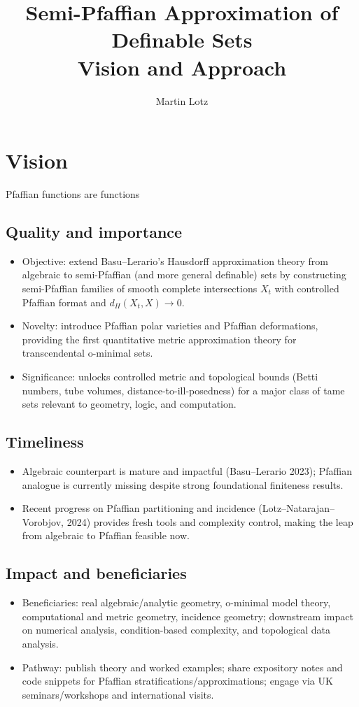 \documentclass[11pt,a4paper]{article}
\title{Semi-Pfaffian Approximation of Definable Sets\\Vision and Approach}
\author{Martin Lotz}
\date{}
\begin{document}
\maketitle


\section{Vision}
Pfaffian functions are functions 
\subsection*{Quality and importance}
\begin{itemize}
  \item Objective: extend Basu--Lerario's Hausdorff approximation theory from algebraic to semi-Pfaffian (and more general definable) sets by constructing semi-Pfaffian families of smooth complete intersections \(X_t\) with controlled Pfaffian format and \(d_H(X_t,X)\to0\).
  \item Novelty: introduce Pfaffian polar varieties and Pfaffian deformations, providing the first quantitative metric approximation theory for transcendental o-minimal sets.
  \item Significance: unlocks controlled metric and topological bounds (Betti numbers, tube volumes, distance-to-ill-posedness) for a major class of tame sets relevant to geometry, logic, and computation.
\end{itemize}

\subsection*{Timeliness}
\begin{itemize}
  \item Algebraic counterpart is mature and impactful (Basu--Lerario 2023); Pfaffian analogue is currently missing despite strong foundational finiteness results.
  \item Recent progress on Pfaffian partitioning and incidence (Lotz--Natarajan--Vorobjov, 2024) provides fresh tools and complexity control, making the leap from algebraic to Pfaffian feasible now.
\end{itemize}

\subsection*{Impact and beneficiaries}
\begin{itemize}
  \item Beneficiaries: real algebraic/analytic geometry, o-minimal model theory, computational and metric geometry, incidence geometry; downstream impact on numerical analysis, condition-based complexity, and topological data analysis.
  \item Pathway: publish theory and worked examples; share expository notes and code snippets for Pfaffian stratifications/approximations; engage via UK seminars/workshops and international visits.
\end{itemize}
\end{document}
